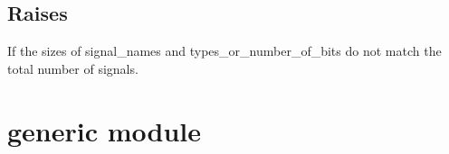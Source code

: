 \documentclass[letterpaper,10pt,english]{sphinxmanual}
\begin{document}
\begin{fulllineitems}
\begin{description}
\end{description}


\subsection{Raises}
\label{\detokenize{functions:id6}}\begin{description}
\sphinxAtStartPar
If the sizes of signal\_names and types\_or\_number\_of\_bits do not match the total number of signals.

\end{description}

\end{fulllineitems}


\sphinxstepscope


\section{generic module}
\label{\detokenize{generic:module-generic}}\label{\detokenize{generic:generic-module}}\label{\detokenize{generic::doc}}
\end{document}
